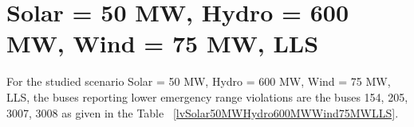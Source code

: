 \documentclass[10pt]{report}
\begin{document}
\section{Solar = 50 MW, Hydro = 600 MW, Wind = 75 MW, LLS}
For the studied scenario Solar = 50 MW, Hydro = 600 MW, Wind = 75 MW, LLS, the buses reporting lower emergency range violations are the buses 154, 205, 3007, 3008 as given in the Table ~\ref{lvSolar50MWHydro600MWWind75MWLLS}.
\begin{table}[H]
\caption{Contingencies reporting bus voltages lower than emergency voltage of 1.1 PU for scenario Solar = 50 MW, Hydro = 600 MW, Wind = 75 MW, LLS}
\label{lvSolar50MWHydro600MWWind75MWLLS}
\centering
{}
\end{table}
\end{document}
